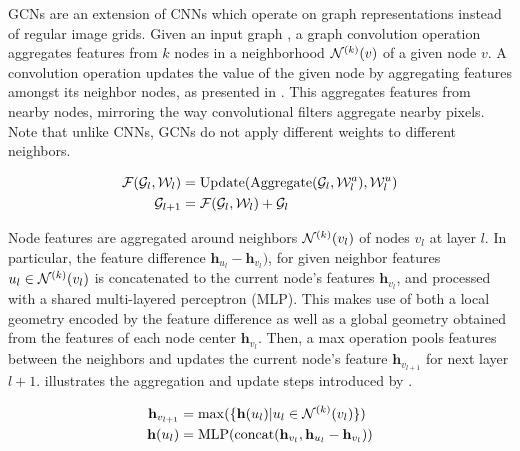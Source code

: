 \documentclass[10pt,twocolumn,letterpaper]{article}
\begin{document}
GCNs are an extension of CNNs which operate on graph representations instead of regular image grids.
Given an input graph \Gc, a graph convolution operation \Fc aggregates features from $k$ nodes in a neighborhood $\mathcal{N}^{(k)}(v)$ of a given node $v$.
A convolution operation \Fc updates the value of the given node by aggregating features amongst its neighbor nodes, as presented in .
This aggregates features from nearby nodes, mirroring the way convolutional filters aggregate nearby pixels.
Note that unlike CNNs, GCNs do not apply different weights to different neighbors. 



\begin{equation}
\begin{aligned}
    \mathcal{F} (\mathcal{G}_l,\mathcal{W}_l )& = \text{Update} (\text{Aggregate} ( \mathcal{G}_l  , \mathcal{W}_l^{a} ) , \mathcal{W}_l^{u} ) \\
    \mathcal{G}_{l+1} & = \mathcal{F} ( \mathcal{G}_l , \mathcal{W}_l ) + \mathcal{G}_l
    \label{eq:GCN}
\end{aligned}
\end{equation}













Node features are aggregated around neighbors $\mathcal{N}^{(k)}(v_l)$ of nodes $v_l$ at layer $l$.
In particular, the feature difference $\mathbf{h}_{u_l}-\mathbf{h}_{v_l})$, for given neighbor features $u_l\in\mathcal{N}^{(k)}(v_l)$ is concatenated to the current node's features $\mathbf{h}_{v_l}$, and processed with a shared multi-layered perceptron (MLP).
This makes use of both a local geometry encoded by the feature difference as well as a global geometry obtained from the features of each node center $\mathbf{h}_{v_l}$.
Then, a max operation pools features between the neighbors and updates the current node's feature $\mathbf{h}_{v_{l+1}}$ for next layer $l+1$.
 illustrates the aggregation and update steps introduced by \EdgeConv.



\begin{equation} 
\begin{aligned} 
    \mathbf{h}_{v_{l+1}} &
    =\max(\{\mathbf{h}(u_l)|u_l\in\mathcal{N}^{(k)}(v_l)\})\\
    \mathbf{h}(u_l) &
    =\text{MLP}(\text{concat}(\mathbf{h}_{v_l},\mathbf{h}_{u_l}-\mathbf{h}_{v_l}))
    \label{eq:EdgeConv}
\end{aligned} 
\end{equation}
\end{document}
